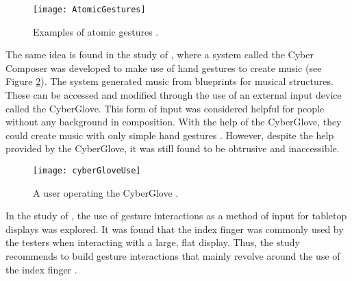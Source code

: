 \begin{comment}
\begin{table}[H]
	\centering
    
    \caption{Language elements for GeForMT \citep{kammer2010towards}} \label{tab:gle}
	\texttt{[image: GeForMTLanguageElements]}
    
\end{table}

\end{comment}

\begin{figure}[H]
	\centering
	\texttt{[image: AtomicGestures]}
    \caption{Examples of atomic gestures \citep{kammer2010towards}.}
    \label{fig:atomicgestures}
\end{figure}


The same idea is found in the study of \cite{ip2005cyber}, where a system called the Cyber Composer was developed to make use of hand gestures to create music (see Figure \ref{fig:cybercomposer-media}). The system generated music from blueprints for musical structures. These can be accessed and modified through the use of an external input device called the CyberGlove. This form of input was considered helpful for people without any background in composition. With the help of the CyberGlove, they could create music with only simple hand gestures \citep{ip2005cyber}. However, despite the help provided by the CyberGlove, it was still found to be obtrusive and inaccessible. 

\begin{figure}[H]
	\centering
	\texttt{[image: cyberGloveUse]}
    \caption{A user operating the CyberGlove \citep{ip2005cyber}.}
    \label{fig:cybercomposer-media}
\end{figure}

In the study of \citet{epps2006a}, the use of gesture interactions as a method of input for tabletop displays was explored. It was found that the index finger was commonly used by the testers when interacting with a large, flat display. Thus, the study recommends to build gesture interactions that mainly revolve around the use of the index finger \citep{epps2006a}.

